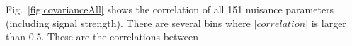 
Fig.~\ref{fig:covarianceAll} shows the correlation of all 151 nuisance parameters 
(including signal strength). There are several bins where $|correlation|$ is larger 
than 0.5. These are the correlations between 

